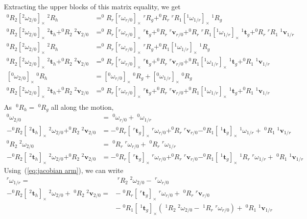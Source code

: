 \documentclass{article}
\newcommand\linvel{\mathbf{v}}
\newcommand\trans{\mathbf{t}}
\begin{document}
Extracting the upper blocks of this matrix equality, we get
\begin{align*}
  ^0R_2[^2\omega_{2/0}]_{\times}\;^2R_h &= ^0R_r[^r\omega_{r/0}]_{\times}\;^rR_g + ^0R_r\;^rR_1[^1\omega_{1/r}]_{\times}\;^1R_g \\
  ^0R_2[^2\omega_{2/0}]_{\times}\;^2\trans_h + ^0R_2\;^2\linvel_{2/0} &=
  ^0R_r[^r\omega_{r/0}]_{\times}\;^r\trans_g + ^0R_r\;^r\linvel_{r/0} + ^0R_r\;^rR_1[^1\omega_{1/r}]_{\times}\;^1\trans_g  + ^0R_r\;^rR_1\;^1\linvel_{1/r} \\
  ^0R_2[^2\omega_{2/0}]_{\times}\;^2R_h &= ^0R_r[^r\omega_{r/0}]_{\times}\;^rR_g + ^0R_1[^1\omega_{1/r}]_{\times}\;^1R_g \\
  ^0R_2[^2\omega_{2/0}]_{\times}\;^2\trans_h + ^0R_2\;^2\linvel_{2/0} &=
  ^0R_r[^r\omega_{r/0}]_{\times}\;^r\trans_g + ^0R_r\;^r\linvel_{r/0} + ^0R_1[^1\omega_{1/r}]_{\times}\;^1\trans_g  + ^0R_1\;^1\linvel_{1/r} \\
  [^0\omega_{2/0}]_{\times}\;^0R_h &= [^0\omega_{r/0}]_{\times}\;^0R_g + [^0\omega_{1/r}]_{\times}\;^0R_g \\
  ^0R_2[^2\omega_{2/0}]_{\times}\;^2\trans_h + ^0R_2\;^2\linvel_{2/0} &=
  ^0R_r[^r\omega_{r/0}]_{\times}\;^r\trans_g + ^0R_r\;^r\linvel_{r/0} + ^0R_1[^1\omega_{1/r}]_{\times}\;^1\trans_g  + ^0R_1\;^1\linvel_{1/r} \\
\end{align*}
As $\;^0R_h = \;^0R_g$ all along the motion,
\begin{align*}
  ^0\omega_{2/0} &= \;^0\omega_{r/0} + \;^0\omega_{1/r}\\
  -^0R_2[\;^2\trans_h]_{\times}\;^2\omega_{2/0} + ^0R_2\;^2\linvel_{2/0} &=
  -^0R_r[\;^r\trans_g]_{\times}\;^r\omega_{r/0} + ^0R_r\;^r\linvel_{r/0} - ^0R_1[\;^1\trans_g]_{\times}\;^1\omega_{1/r} + \;^0R_1\;^1\linvel_{1/r} \\
  ^0R_2\;^2\omega_{2/0} &= \;^0R_r\;^r\omega_{r/0} + \;^0R_r\;^r\omega_{1/r}\\
  -^0R_2[\;^2\trans_h]_{\times}\;^2\omega_{2/0} + ^0R_2\;^2\linvel_{2/0} &=
  -^0R_r[\;^r\trans_g]_{\times}\;^r\omega_{r/0} + ^0R_r\;^r\linvel_{r/0} - ^0R_1[\;^1\trans_g]_{\times} \;^1R_{r}\;^r\omega_{1/r} + \;^0R_1\;^1\linvel_{1/r}
\end{align*}
Using~(\ref{eq:jacobian arm}), we can write
\begin{align*}
  ^r\omega_{1/r} =& \;^rR_2\;^2\omega_{2/0} - \;^r\omega_{r/0}\\
  -^0R_2[\;^2\trans_h]_{\times}\;^2\omega_{2/0} + \;^0R_2\;^2\linvel_{2/0} =&
  -\;^0R_r[\;^r\trans_g]_{\times}\;^r\omega_{r/0} + \;^0R_r\;^r\linvel_{r/0} \\ &-\;^0R_1[\;^1\trans_g]_{\times} (\;^1R_2\;^2\omega_{2/0} - \;^1R_{r}\;^r\omega_{r/0}) + \;^0R_1\;^1\linvel_{1/r}
\end{align*}
\end{document}

